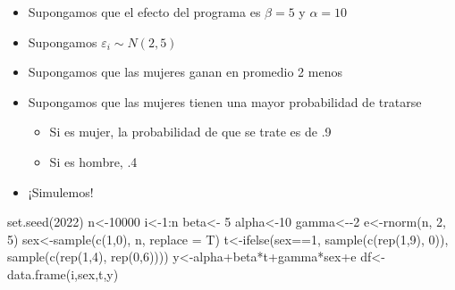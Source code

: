 \documentclass[
  ignorenonframetext,
]{beamer}
\newenvironment{Shaded}{\begin{snugshade}}{\end{snugshade}}
\newcommand{\AttributeTok}[1]{\textcolor[rgb]{0.77,0.63,0.00}{#1}}
\newcommand{\DecValTok}[1]{\textcolor[rgb]{0.00,0.00,0.81}{#1}}
\newcommand{\FunctionTok}[1]{\textcolor[rgb]{0.00,0.00,0.00}{#1}}
\newcommand{\NormalTok}[1]{#1}
\newcommand{\OtherTok}[1]{\textcolor[rgb]{0.56,0.35,0.01}{#1}}
\newcommand{\SpecialCharTok}[1]{\textcolor[rgb]{0.00,0.00,0.00}{#1}}
\providecommand{\tightlist}{%
  \setlength{\itemsep}{0pt}\setlength{\parskip}{0pt}}
\begin{document}
\begin{frame}{}
\protect\hypertarget{section-29}{}
\begin{itemize}
\tightlist
\item
  Supongamos que el efecto del programa es \(\beta=5\) y \(\alpha=10\)
\item
  Supongamos \(\varepsilon_i\sim N(2,5)\)
\item
  Supongamos que las mujeres ganan en promedio 2 menos
\item
  Supongamos que las mujeres tienen una mayor probabilidad de tratarse

  \begin{itemize}
  \tightlist
  \item
    Si es mujer, la probabilidad de que se trate es de .9
  \item
    Si es hombre, .4
  \end{itemize}
\item
  ¡Simulemos!
\end{itemize}
\end{frame}

\begin{frame}[fragile]{}
\protect\hypertarget{section-30}{}
\begin{Shaded}
\begin{Highlighting}[]
\FunctionTok{set.seed}\NormalTok{(}\DecValTok{2022}\NormalTok{)}
\NormalTok{n}\OtherTok{\textless{}{-}}\DecValTok{10000}
\NormalTok{i}\OtherTok{\textless{}{-}}\DecValTok{1}\SpecialCharTok{:}\NormalTok{n}
\NormalTok{beta}\OtherTok{\textless{}{-}} \DecValTok{5}
\NormalTok{alpha}\OtherTok{\textless{}{-}}\DecValTok{10}
\NormalTok{gamma}\OtherTok{\textless{}{-}}\SpecialCharTok{{-}}\DecValTok{2}
\NormalTok{e}\OtherTok{\textless{}{-}}\FunctionTok{rnorm}\NormalTok{(n, }\DecValTok{2}\NormalTok{, }\DecValTok{5}\NormalTok{)}
\NormalTok{sex}\OtherTok{\textless{}{-}}\FunctionTok{sample}\NormalTok{(}\FunctionTok{c}\NormalTok{(}\DecValTok{1}\NormalTok{,}\DecValTok{0}\NormalTok{), n, }\AttributeTok{replace =}\NormalTok{ T)}
\NormalTok{t}\OtherTok{\textless{}{-}}\FunctionTok{ifelse}\NormalTok{(sex}\SpecialCharTok{==}\DecValTok{1}\NormalTok{, }\FunctionTok{sample}\NormalTok{(}\FunctionTok{c}\NormalTok{(}\FunctionTok{rep}\NormalTok{(}\DecValTok{1}\NormalTok{,}\DecValTok{9}\NormalTok{), }\DecValTok{0}\NormalTok{)), }\FunctionTok{sample}\NormalTok{(}\FunctionTok{c}\NormalTok{(}\FunctionTok{rep}\NormalTok{(}\DecValTok{1}\NormalTok{,}\DecValTok{4}\NormalTok{), }\FunctionTok{rep}\NormalTok{(}\DecValTok{0}\NormalTok{,}\DecValTok{6}\NormalTok{))))}
\NormalTok{y}\OtherTok{\textless{}{-}}\NormalTok{alpha}\SpecialCharTok{+}\NormalTok{beta}\SpecialCharTok{*}\NormalTok{t}\SpecialCharTok{+}\NormalTok{gamma}\SpecialCharTok{*}\NormalTok{sex}\SpecialCharTok{+}\NormalTok{e}
\NormalTok{df}\OtherTok{\textless{}{-}}\FunctionTok{data.frame}\NormalTok{(i,sex,t,y)}
\end{Highlighting}
\end{Shaded}
\end{frame}
\end{document}
